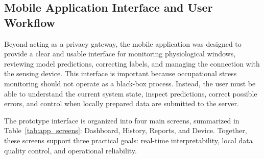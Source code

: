 \documentclass[12pt]{article}
\begin{document}
\FloatBarrier

\subsection{Mobile Application Interface and User Workflow}

Beyond acting as a privacy gateway, the mobile application was designed to provide a clear and usable interface for monitoring physiological windows, reviewing model predictions, correcting labels, and managing the connection with the sensing device. This interface is important because occupational stress monitoring should not operate as a black-box process. Instead, the user must be able to understand the current system state, inspect predictions, correct possible errors, and control when locally prepared data are submitted to the server.

The prototype interface is organized into four main screens, summarized in Table~\ref{tab:app_screens}: Dashboard, History, Reports, and Device. Together, these screens support three practical goals: real-time interpretability, local data quality control, and operational reliability.

\begin{table}[H]
\centering
\caption{Main screens and user-facing functions of the mobile prototype.}
\label{tab:app_screens}
\end{table}
\end{document}
